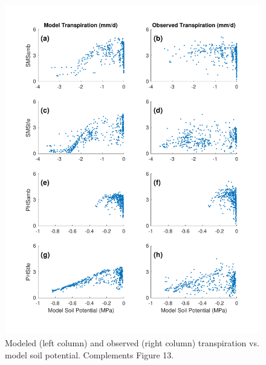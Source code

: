 \documentclass[draft]{agujournal}
\begin{document}
     \begin{figure}[h]
     \centering
     \includegraphics[width=30pc]{figs/suppcool.pdf}
     \caption{Modeled (left column) and observed (right column) transpiration  vs. model soil potential.
     Complements Figure 13.}
     \label{supp:cool}
  \end{figure}
          \clearpage
          



\end{document}
